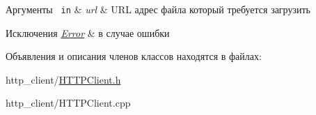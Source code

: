 \begin{DoxyParams}[1]{Аргументы}
\mbox{\texttt{ in}}  & {\em url} & U\+RL адрес файла который требуется загрузить \\
\hline
\end{DoxyParams}

\begin{DoxyExceptions}{Исключения}
{\em \mbox{\hyperlink{classError}{Error}}} & в случае ошибки \\
\hline
\end{DoxyExceptions}


Объявления и описания членов классов находятся в файлах\+:\begin{DoxyCompactItemize}
\item 
http\+\_\+client/\mbox{\hyperlink{HTTPClient_8h}{H\+T\+T\+P\+Client.\+h}}\item 
http\+\_\+client/H\+T\+T\+P\+Client.\+cpp\end{DoxyCompactItemize}
